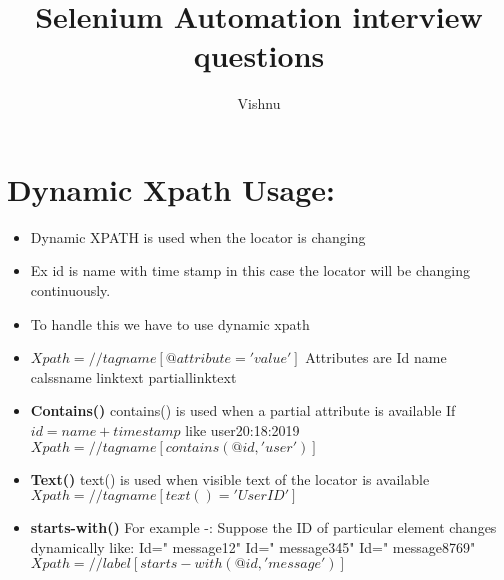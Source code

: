 \documentclass[12pt, oneside]{article}
\title{\bf Selenium Automation interview questions}
\begin{document}
\author{Vishnu}
\maketitle
\section{Dynamic Xpath Usage:}

\begin{itemize}
    \item Dynamic XPATH is used when the locator is changing  
    \item Ex id is name with time stamp in this case the locator will be changing continuously.
    \item To handle this we have to use dynamic xpath
    \item $Xpath = //tagname[@attribute='value']$
        \subitem Attributes are 
        \subitem Id
        \subitem name
        \subitem calssname
        \subitem linktext
        \subitem partiallinktext
    \item \textbf{Contains()}
        \subitem contains() is used when a partial attribute is available
        \subitem If $id=name+timestamp$ like user20:18:2019
        \subitem $Xpath=//tagname[contains(@id,'user')]$
    \item \textbf{Text()}
        \subitem text() is used when visible text of the locator is available
        \subitem $Xpath=//tagname[text()='UserID']$
    \item \textbf{starts-with()}
        \subitem For example -: Suppose the ID of particular element changes 
        dynamically like: 
        Id=" message12"
        Id=" message345"
        Id=" message8769"
        \subitem $Xpath=//label[starts-with(@id,'message')]$
\end{itemize}
\end{document}
